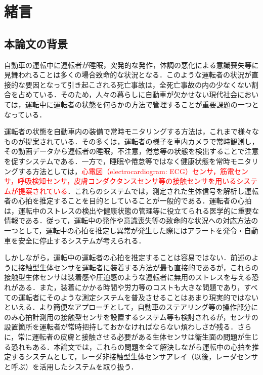 \chapter{緒言}
\label{chap:intro}

\section{本論文の背景}
自動車の運転中に運転者が睡眠，突発的な発作，体調の悪化による意識喪失等に見舞われることは多くの場合致命的な状況となる．このような運転者の状況が直接的な要因となって引き起こされる死亡事故は，全死亡事故の内の少なくない割合を占めている．そのため，人々の暮らしに自動車が欠かせない現代社会においては，運転中に運転者の状態を何らかの方法で管理することが重要課題の一つとなっている．

運転者の状態を自動車内の装備で常時モニタリングする方法は，これまで様々なものが提案されている\cite{sensorreview}．その多くは，運転者の様子を車内カメラで常時観測し，その動画データから運転者の睡眠，不注意，倦怠等の状態を検出することで注意を促すシステムである\cite{system1, system2, system3}．一方で，睡眠や倦怠等ではなく健康状態を常時モニタリングする方法としては，\textcolor{red}{心電図（electrocardiogram: ECG）センサ，筋電センサ，呼吸検知センサ，皮膚コンダクタンスセンサ等の接触センサを用いるシステムが提案されている}\cite{contactsensor1, contactsensor2}．これらのシステムでは，測定された生体信号を解析し運転者の心拍を推定することを目的としていることが一般的である．運転者の心拍は，運転中のストレスの検出や健康状態の管理等に役立てられる医学的に重要な情報である．従って，運転中の発作や意識喪失等の致命的な状況への対応方法の一つとして，運転中の心拍を推定し異常が発生した際にはアラートを発令・自動車を安全に停止するシステムが考えられる．

しかしながら，運転中の運転者の心拍を推定することは容易ではない．前述のように接触型生体センサを運転者に装着する方法が最も直接的であるが，これらの接触型生体センサは装着感や圧迫感のような運転者に無用のストレスを与える恐れがある．また，装着にかかる時間や労力等のコストも大きな問題であり，すべての運転者にそのような測定システムを普及させることはあまり現実的ではないといえる．より簡便なアプローチとして，自動車のステアリング等の操作部分にのみ心拍計測用の接触型センサを設置するシステム\cite{eazyap1, eazyap2, eazyap3}等も検討されるが，センサの設置箇所を運転者が常時把持しておかなければならない煩わしさが残る．さらに，常に運転者の皮膚と接触させる必要がある生体センサは衛生面の問題が生じる恐れもある．本論文では，これらの問題を全て解決しながら運転中の心拍を推定するシステムとして，レーダ非接触型生体センサアレイ（以後，レーダセンサと呼ぶ）を活用したシステムを取り扱う．


